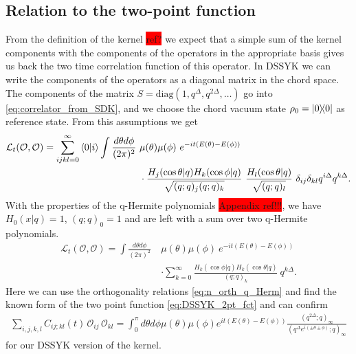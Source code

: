 \documentclass[11pt,a4paper]{article}
\begin{document}
\subsection{Relation to the two-point function}
From the definition of the kernel \colorbox{red}{ref{?}} we expect that a simple sum of the kernel components with the components of the operators in the appropriate basis gives us back the two time correlation function of this operator. In DSSYK we can write the components of the operators as a diagonal matrix in the chord space. The components of the matrix $S = \mathrm{diag}(1, q^{\Delta}, q^{2 \Delta}, \dots)$ go into \cref{eq:correlator_from_SDK}, and we choose the chord vacuum state $\rho_0 = \ketbra{0}$ as reference state.
From this assumptions we get
\begin{equation}
    \begin{split}
    \mathcal{L}_t(\mathcal{O}, \mathcal{O}) = \sum_{ijkl = 0}^{\infty}\braket{0}{i} \int \frac{d\theta d\phi}{(2\pi)^2} \ & \mu(\theta) \mu(\phi) \
    e^{-i t(E(\theta)-E(\phi))} \\
    & \cdot \frac{H_j(\cos \theta |q) H_k(\cos \phi|q)}{\sqrt{(q;q)_j (q;q)_k}} \ 
    \frac{H_l(\cos\theta |q)}{\sqrt{(q;q)_l}} \ \delta_{ij} \delta_{kl} q^{i\Delta} q^{k \Delta}.
    \end{split}
\end{equation}
With the properties of the q-Hermite polynomials \colorbox{red}{Appendix ref!!!}, we have $H_0(x|q) = 1$, $(q;q)_0 = 1$ and are left with a sum over two q-Hermite polynomials. 
\begin{equation}
    \begin{split}
    \mathcal{L}_t(\mathcal{O}, \mathcal{O}) = \int \frac{d\theta d\phi}{(2\pi)^2} \ & \mu(\theta) \mu(\phi) \
    e^{-i t(E(\theta)-E(\phi))} \\
    & \cdot \sum_{k = 0}^{\infty} \frac{H_k(\cos \phi|q) H_k(\cos\theta |q)}{(q;q)_k} \ 
     q^{k \Delta}.
    \end{split}
\end{equation}
Here we can use the orthogonality relations \ref{eq:n_orth_q_Herm} and find the known form of the two point function \cref{eq:DSSYK_2pt_fct} and can confirm
\begin{align}
    \sum_{i,j,k,l} C_{ij;kl}(t)\,\mathcal{O}_{ij}\,\mathcal{O}_{kl} = \int_0^\pi d\theta d\phi \mu(\theta) \mu(\phi) e^{it(E(\theta)-E(\phi))} \frac{(q^{2 \Delta};q)_{\infty}}{(q^{\Delta} e^{i(\pm \theta \pm \phi)};q)_\infty}
\end{align}
for our DSSYK version of the kernel. 
\end{document}

